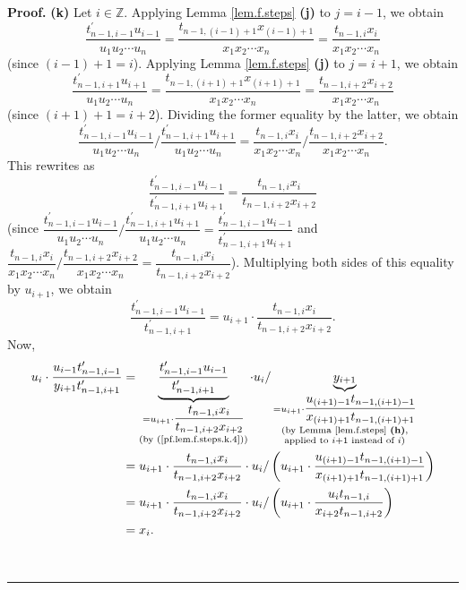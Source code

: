 \documentclass[numbers=enddot,12pt,final,onecolumn,notitlepage]{scrartcl}%
\theoremstyle{definition}
\newenvironment{proof}[1][Proof]{\noindent\textbf{#1.} }{\ \rule{0.5em}{0.5em}}
\newenvironment{verlong}{}{}
\begin{document}
\begin{proof}
\begin{verlong}
\textbf{(k)} Let $i\in\mathbb{Z}$. Applying Lemma \ref{lem.f.steps}
\textbf{(j)} to $j=i-1$, we obtain%
\[
\dfrac{t_{n-1,i-1}^{\prime}u_{i-1}}{u_{1}u_{2}\cdots u_{n}}=\dfrac
{t_{n-1,\left(  i-1\right)  +1}x_{\left(  i-1\right)  +1}}{x_{1}x_{2}\cdots
x_{n}}=\dfrac{t_{n-1,i}x_{i}}{x_{1}x_{2}\cdots x_{n}}%
\]
(since $\left(  i-1\right)  +1=i$). Applying Lemma \ref{lem.f.steps}
\textbf{(j)} to $j=i+1$, we obtain%
\[
\dfrac{t_{n-1,i+1}^{\prime}u_{i+1}}{u_{1}u_{2}\cdots u_{n}}=\dfrac
{t_{n-1,\left(  i+1\right)  +1}x_{\left(  i+1\right)  +1}}{x_{1}x_{2}\cdots
x_{n}}=\dfrac{t_{n-1,i+2}x_{i+2}}{x_{1}x_{2}\cdots x_{n}}%
\]
(since $\left(  i+1\right)  +1=i+2$). Dividing the former equality by the
latter, we obtain%
\[
\dfrac{t_{n-1,i-1}^{\prime}u_{i-1}}{u_{1}u_{2}\cdots u_{n}}/\dfrac
{t_{n-1,i+1}^{\prime}u_{i+1}}{u_{1}u_{2}\cdots u_{n}}=\dfrac{t_{n-1,i}x_{i}%
}{x_{1}x_{2}\cdots x_{n}}/\dfrac{t_{n-1,i+2}x_{i+2}}{x_{1}x_{2}\cdots x_{n}}.
\]
This rewrites as%
\[
\dfrac{t_{n-1,i-1}^{\prime}u_{i-1}}{t_{n-1,i+1}^{\prime}u_{i+1}}%
=\dfrac{t_{n-1,i}x_{i}}{t_{n-1,i+2}x_{i+2}}%
\]
(since $\dfrac{t_{n-1,i-1}^{\prime}u_{i-1}}{u_{1}u_{2}\cdots u_{n}}%
/\dfrac{t_{n-1,i+1}^{\prime}u_{i+1}}{u_{1}u_{2}\cdots u_{n}}=\dfrac
{t_{n-1,i-1}^{\prime}u_{i-1}}{t_{n-1,i+1}^{\prime}u_{i+1}}$ and\newline%
$\dfrac{t_{n-1,i}x_{i}}{x_{1}x_{2}\cdots x_{n}}/\dfrac{t_{n-1,i+2}x_{i+2}%
}{x_{1}x_{2}\cdots x_{n}}=\dfrac{t_{n-1,i}x_{i}}{t_{n-1,i+2}x_{i+2}}$).
Multiplying both sides of this equality by $u_{i+1}$, we obtain%
\begin{equation}
\dfrac{t_{n-1,i-1}^{\prime}u_{i-1}}{t_{n-1,i+1}^{\prime}}=u_{i+1}\cdot
\dfrac{t_{n-1,i}x_{i}}{t_{n-1,i+2}x_{i+2}}. \label{pf.lem.f.steps.k.4}%
\end{equation}
Now,%
\begin{align*}
u_{i}\cdot\dfrac{u_{i-1}t_{n-1,i-1}^{\prime}}{y_{i+1}t_{n-1,i+1}^{\prime}}  &
=\underbrace{\dfrac{t_{n-1,i-1}^{\prime}u_{i-1}}{t_{n-1,i+1}^{\prime}}%
}_{\substack{=u_{i+1}\cdot\dfrac{t_{n-1,i}x_{i}}{t_{n-1,i+2}x_{i+2}%
}\\\text{(by (\ref{pf.lem.f.steps.k.4}))}}}\cdot u_{i}/\underbrace{y_{i+1}%
}_{\substack{=u_{i+1}\cdot\dfrac{u_{\left(  i+1\right)  -1}t_{n-1,\left(
i+1\right)  -1}}{x_{\left(  i+1\right)  +1}t_{n-1,\left(  i+1\right)  +1}%
}\\\text{(by Lemma \ref{lem.f.steps} \textbf{(h)},}\\\text{applied to
}i+1\text{ instead of }i\text{)}}}\\
&  =u_{i+1}\cdot\dfrac{t_{n-1,i}x_{i}}{t_{n-1,i+2}x_{i+2}}\cdot u_{i}/\left(
u_{i+1}\cdot\dfrac{u_{\left(  i+1\right)  -1}t_{n-1,\left(  i+1\right)  -1}%
}{x_{\left(  i+1\right)  +1}t_{n-1,\left(  i+1\right)  +1}}\right) \\
&  =u_{i+1}\cdot\dfrac{t_{n-1,i}x_{i}}{t_{n-1,i+2}x_{i+2}}\cdot u_{i}/\left(
u_{i+1}\cdot\dfrac{u_{i}t_{n-1,i}}{x_{i+2}t_{n-1,i+2}}\right) \\
&  =x_{i}.
\end{align*}


\end{verlong}
\end{proof}
\end{document}
